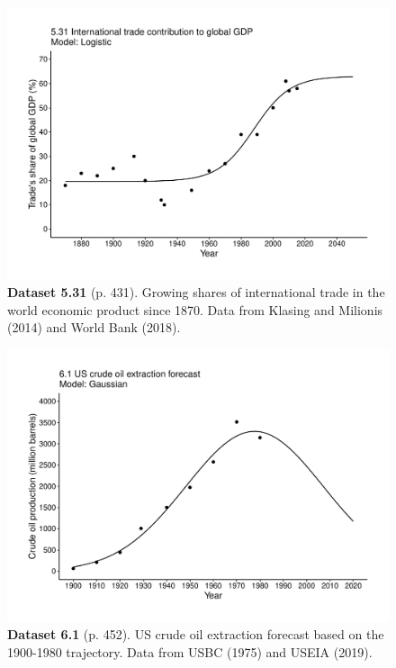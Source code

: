 \documentclass[aps,rmp,preprint,superscriptaddress,10pt,onecolumn]{article}
\begin{document}
\clearpage
\begin{figure}[h]
\includegraphics[width=\textwidth]{output/figs-ggplot/5.31.pdf}
\caption*{\textbf{Dataset 5.31} (p. 431). Growing shares of international trade in the world economic product since 1870. Data from Klasing and Milionis (2014) and World Bank (2018).}
\end{figure}
	
\clearpage
\begin{figure}[h]
\includegraphics[width=\textwidth]{output/figs-ggplot/6.1.pdf}
\caption*{\textbf{Dataset 6.1} (p. 452). US crude oil extraction forecast based on the 1900-1980 trajectory. Data from USBC (1975) and USEIA (2019). }
\end{figure}
	
\end{document}
